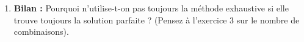 \begin{Exercise}[title={[BONUS] La monnaie de sa pièce }]
\begin{enumerate}
\begin{lstlisting}[style=pythonstyle, language=Python]
    meilleure_sol = possibilites[0]
    
    for combi in possibilites:
        # Si la longueur de la combinaison actuelle est plus petite
        if len(combi) < len(................):
            meilleure_sol = ................
            
    return meilleure_sol
    \end{lstlisting}
    
    \item \textbf{Bilan :} Pourquoi n'utilise-t-on pas toujours la méthode exhaustive si elle trouve toujours la solution parfaite ? (Pensez à l'exercice 3 sur le nombre de combinaisons).
    \dotfill
    \dotfill
\end{enumerate}
\end{Exercise}
